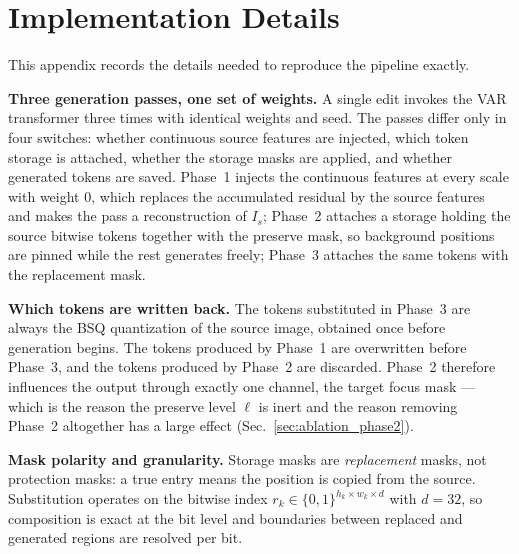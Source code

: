 
\section{Implementation Details}
\label{app:impl}

This appendix records the details needed to reproduce the pipeline exactly.

\noindent\textbf{Three generation passes, one set of weights.}
A single edit invokes the VAR transformer three times with identical weights and
seed. The passes differ only in four switches: whether continuous source features
are injected, which token storage is attached, whether the storage masks are
applied, and whether generated tokens are saved. Phase~1 injects the continuous
features at every scale with weight $0$, which replaces the accumulated residual
by the source features and makes the pass a reconstruction of $I_s$; Phase~2
attaches a storage holding the source bitwise tokens together with the preserve
mask, so background positions are pinned while the rest generates freely;
Phase~3 attaches the same tokens with the replacement mask.

\noindent\textbf{Which tokens are written back.}
The tokens substituted in Phase~3 are always the BSQ quantization of the source
image, obtained once before generation begins. The tokens produced by Phase~1 are
overwritten before Phase~3, and the tokens produced by Phase~2 are discarded.
Phase~2 therefore influences the output through exactly one channel, the target
focus mask --- which is the reason the preserve level $\ell$ is inert and the
reason removing Phase~2 altogether has a large effect
(Sec.~\ref{sec:ablation_phase2}).

\noindent\textbf{Mask polarity and granularity.}
Storage masks are \emph{replacement} masks, not protection masks: a true entry
means the position is copied from the source. Substitution operates on the
bitwise index $r_k \in \{0,1\}^{h_k \times w_k \times d}$ with $d{=}32$, so
composition is exact at the bit level and boundaries between replaced and
generated regions are resolved per bit.

